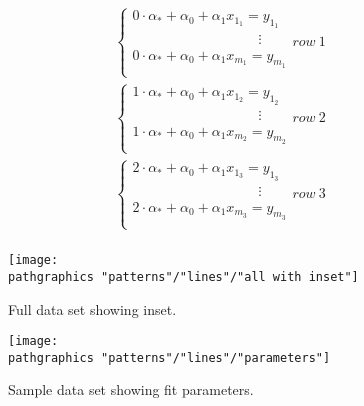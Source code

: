   \begin{equation}
    \begin{split}
      \begin{cases}
        0\cdot\alpha_{*} + \alpha_{0} + \alpha_{1} x_{1_{1}} = y_{1_{1}} \\
        \qquad \qquad \qquad \qquad \quad \vdots \\
        0\cdot\alpha_{*} + \alpha_{0} + \alpha_{1} x_{m_{1}} = y_{m_{1}} \\
      \end{cases}
      row\ 1 \\
      \begin{cases}
        1\cdot\alpha_{*} + \alpha_{0} + \alpha_{1} x_{1_{2}} = y_{1_{2}} \\
        \qquad \qquad \qquad \qquad \quad \vdots \\
        1\cdot\alpha_{*} + \alpha_{0} + \alpha_{1} x_{m_{2}} = y_{m_{2}} \\
      \end{cases}
      row\ 2 \\
      \begin{cases}
        2\cdot\alpha_{*} + \alpha_{0} + \alpha_{1} x_{1_{3}} = y_{1_{3}} \\
        \qquad \qquad \qquad \qquad \quad \vdots \\
        2\cdot\alpha_{*} + \alpha_{0} + \alpha_{1} x_{m_{3}} = y_{m_{3}} \\
      \end{cases}
      row\ 3 \\
    \end{split}
  \label{eq:system}
  \end{equation}



\begin{figure}[htbp] %
   \centering
   \texttt{[image: \\pathgraphics "patterns"/"lines"/"all with inset"]} 
   \caption{Full data set showing inset.}
   \label{fig:simulation inset}
\end{figure}

\begin{figure}[htbp] %
   \centering
   \texttt{[image: \\pathgraphics "patterns"/"lines"/"parameters"]} 
   \caption{Sample data set showing fit parameters.}
   \label{fig:parameters}
\end{figure}
\clearpage

